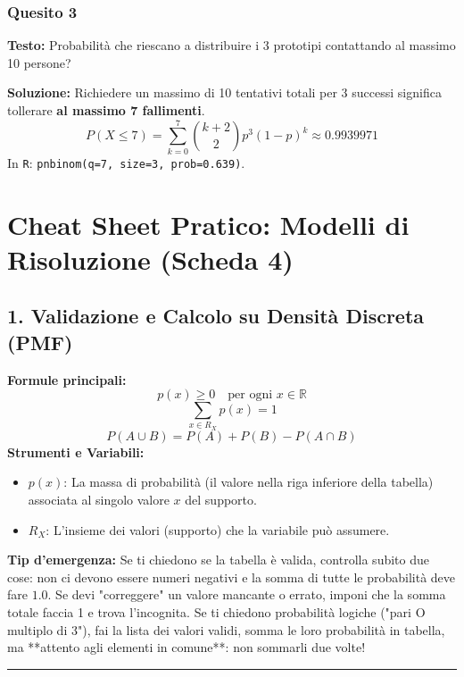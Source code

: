 \documentclass[12pt, a4paper]{article}
\begin{document}
\subsubsection*{Quesito 3}
\textbf{Testo:} Probabilità che riescano a distribuire i 3 prototipi contattando al massimo 10 persone?

\textbf{Soluzione:}
Richiedere un massimo di 10 tentativi totali per 3 successi significa tollerare \textbf{al massimo 7 fallimenti}.
$$ P(X \le 7) = \sum_{k=0}^{7} \binom{k+2}{2} p^3 (1-p)^k \approx 0.9939971 $$
In \texttt{R}: \texttt{pnbinom(q=7, size=3, prob=0.639)}.


\section*{Cheat Sheet Pratico: Modelli di Risoluzione (Scheda 4)}

\subsection*{1. Validazione e Calcolo su Densità Discreta (PMF)}
\textbf{Formule principali:}
$$ p(x) \ge 0 \quad \text{per ogni } x \in \mathbb{R} $$
$$ \sum_{x \in R_X} p(x) = 1 $$
$$ P(A \cup B) = P(A) + P(B) - P(A \cap B) $$
\textbf{Strumenti e Variabili:}
\begin{itemize}
    \item $p(x)$: La massa di probabilità (il valore nella riga inferiore della tabella) associata al singolo valore $x$ del supporto.
    \item $R_X$: L'insieme dei valori (supporto) che la variabile può assumere.
\end{itemize}
\textbf{Tip d'emergenza:} Se ti chiedono se la tabella è valida, controlla subito due cose: non ci devono essere numeri negativi e la somma di tutte le probabilità deve fare $1.0$. Se devi "correggere" un valore mancante o errato, imponi che la somma totale faccia 1 e trova l'incognita. Se ti chiedono probabilità logiche ("pari O multiplo di 3"), fai la lista dei valori validi, somma le loro probabilità in tabella, ma **attento agli elementi in comune**: non sommarli due volte!

\vspace{0.3cm}\hrule\vspace{0.3cm}

\end{document}
